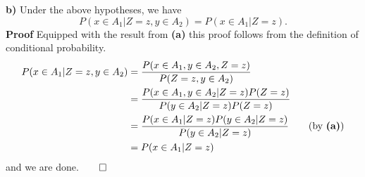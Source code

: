 \documentclass[11pt, letterpaper]{article}
\begin{document}
    {\bf b)} Under the above hypotheses, we have
    \[P(x\in A_1|Z=z,y\in A_2)=P(x\in A_1|Z=z).\]
    {\bf Proof} Equipped with the result from {\bf (a)} this proof follows from the definition of conditional probability. 
    \begin{align*}
        P(x\in A_1|Z=z,y\in A_2)&=\frac{P(x\in A_1,y\in A_2,Z=z)}{P(Z=z,y\in A_2)}\\
        &=\frac{P(x\in A_1,y\in A_2|Z=z)P(Z=z)}{P(y\in A_2|Z=z)P(Z=z)}\\
        &=\frac{P(x\in A_1|Z=z)P(y\in A_2|Z=z)}{P(y\in A_2|Z=z)}\tag{by {\bf (a)}}\\
        &=P(x\in A_1|Z=z)
    \end{align*}
    and we are done.\hfill{$\qed$}\\[10pt]
\end{document}
